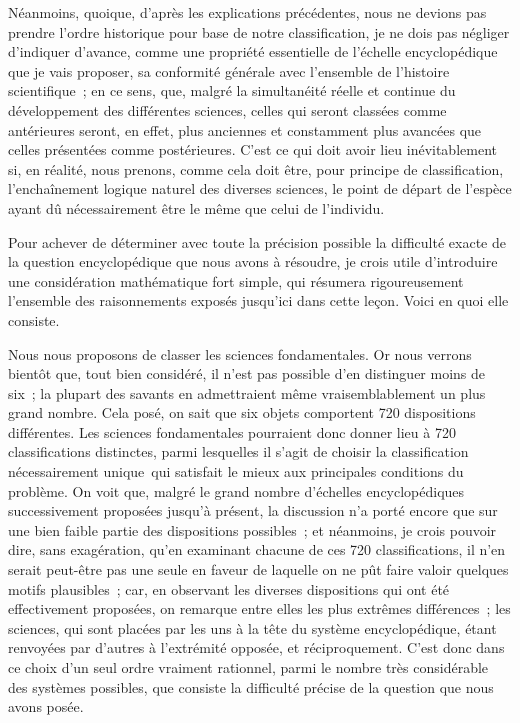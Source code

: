 \documentclass[french,twoside]{book} %
\begin{document}
Néanmoins, quoique, d’après les explications précédentes, nous ne devions pas prendre l’ordre historique pour base de notre classification, je ne dois pas négliger d’indiquer d’avance, comme une propriété essentielle de l’échelle encyclopédique que je vais proposer, sa conformité générale avec l’ensemble de l’histoire scientifique ; en ce sens, que, malgré la simultanéité réelle et continue du développement des différentes sciences, celles qui seront classées comme antérieures seront, en effet, plus anciennes et constamment plus avancées que celles présentées comme postérieures. C’est ce qui doit avoir lieu inévitablement si, en réalité, nous prenons, comme cela doit être, pour principe de classification, l’enchaînement logique naturel des diverses sciences, le point de départ de l’espèce ayant dû nécessairement être le même que celui de l’individu.\par
Pour achever de déterminer avec toute la précision possible la difficulté exacte de la question encyclopédique que nous avons à résoudre, je crois utile d’introduire une considération mathématique fort simple, qui résumera rigoureusement l’ensemble des raisonnements exposés jusqu’ici dans cette leçon. Voici en quoi elle consiste.\par
Nous nous proposons de classer les sciences fondamentales. Or nous verrons bientôt que, tout bien considéré, il n’est pas possible d’en distinguer moins de six ; la plupart des savants en admettraient même vraisemblablement un plus grand nombre. Cela posé, on sait que six objets comportent 720 dispositions différentes. Les sciences fondamentales pourraient donc donner lieu à 720 classifications distinctes, parmi lesquelles il s’agit de choisir la classification nécessairement unique qui satisfait le mieux aux principales conditions du problème. On voit que, malgré le grand nombre d’échelles encyclopédiques successivement proposées jusqu’à présent, la discussion n’a porté encore que sur une bien faible partie des dispositions possibles ; et néanmoins, je crois pouvoir dire, sans exagération, qu’en examinant chacune de ces 720 classifications, il n’en serait peut-être pas une seule en faveur de laquelle on ne pût faire valoir quelques motifs plausibles ; car, en observant les diverses dispositions qui ont été effectivement proposées, on remarque entre elles les plus extrêmes différences ; les sciences, qui sont placées par les uns à la tête du système encyclopédique, étant renvoyées par d’autres à l’extrémité opposée, et réciproquement. C’est donc dans ce choix d’un seul ordre vraiment rationnel, parmi le nombre très considérable des systèmes possibles, que consiste la difficulté précise de la question que nous avons posée.
\end{document}
